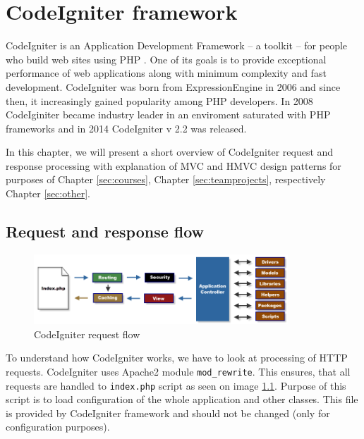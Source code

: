 \chapter{CodeIgniter framework}


CodeIgniter is an Application Development Framework -- a toolkit -- for people who build web sites using PHP  \cite{codeigniter}. One of its goals is to provide exceptional performance of web applications along with minimum complexity and fast development. CodeIgniter was born from ExpressionEngine \cite{codeigniter} in 2006 and since then, it increasingly gained popularity among PHP developers. In 2008 CodeIginiter became industry leader in an enviroment saturated with PHP frameworks \cite{codeigniter} and in 2014 CodeIgniter v 2.2 was released. 

In this chapter, we will present a short overview of CodeIgniter request and response processing with explanation of MVC and HMVC design patterns for purposes of Chapter \ref{sec:courses}, Chapter \ref{sec:teamprojects}, respectively Chapter \ref{sec:other}.

\section{Request and response flow}

\begin{figure}[h]
    \centering
    \includegraphics[width=0.85\textwidth]{images/codeigniter.png}
    \caption{CodeIgniter request flow}
    \label{codeigniter_flow}
\end{figure}


To understand how CodeIgniter works, we have to look at processing of HTTP requests. CodeIgniter uses Apache2  module \texttt{mod\_rewrite}. This ensures, that all requests are handled to \texttt{index.php} script as seen on image \ref{codeigniter_flow}. Purpose of this script is to load configuration of the whole application and other classes. This file is provided by CodeIgniter framework and should not be changed (only for configuration purposes).

